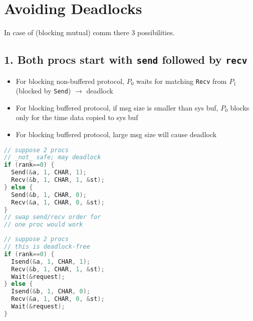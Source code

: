\section*{Avoiding Deadlocks}
In case of (blocking mutual) comm there 3 possibilities.
\subsection*{1. Both procs start with \texttt{send} followed by \texttt{recv}}
\begin{itemize}
\item For blocking non-buffered protocol, $P_0$ waits for matching \texttt{Recv} from $P_1$ (blocked by \texttt{Send}) $\rightarrow$ deadlock
\item For blocking buffered protocol, if msg size is smaller than sys buf, $P_0$ blocks only for the time data copied to sys buf
\item For blocking buffered protocol, large msg size will cause deadlock
\end{itemize}
\begin{minipage}{0.5\linewidth}
\begin{lstlisting}[language=C,xleftmargin=2pt]
// suppose 2 procs
// _not_ safe; may deadlock
if (rank==0) {
  Send(&a, 1, CHAR, 1);
  Recv(&b, 1, CHAR, 1, &st);
} else {
  Send(&b, 1, CHAR, 0);
  Recv(&a, 1, CHAR, 0, &st);
}
// swap send/recv order for
// one proc would work
\end{lstlisting}
\end{minipage}
\begin{minipage}{0.5\linewidth}
\begin{lstlisting}[language=C,xleftmargin=2pt]
// suppose 2 procs
// this is deadlock-free
if (rank==0) {
  Isend(&a, 1, CHAR, 1);
  Recv(&b, 1, CHAR, 1, &st);
  Wait(&request);
} else {
  Isend(&b, 1, CHAR, 0);
  Recv(&a, 1, CHAR, 0, &st);
  Wait(&request);
}
\end{lstlisting}
\end{minipage}

